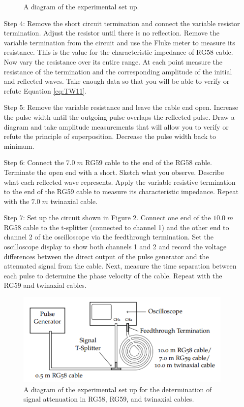 \documentclass[12pt, a4paper, oneside, openright, titlepage]{book}
\begin{document}
\begin{itemize}[leftmargin = 50pt]
\begin{figure}[H]
    \caption{A diagram of the experimental set up.}
    \label{fig:TW2}
\end{figure}
    \item[Step 4:] Remove the short circuit termination and connect the variable resistor termination. Adjust the resistor until there is no reflection. Remove the variable termination from the circuit and use the Fluke meter to measure its resistance. This is the value for the characteristic impedance of RG58 cable. Now vary the resistance over its entire range. At each point measure the resistance of the termination and the corresponding amplitude of the initial and reflected waves. Take enough data so that you will be able to verify or refute Equation \ref{eq:TW11}.
    \item[Step 5:] Remove the variable resistance and leave the cable end open. Increase the pulse width until the outgoing pulse overlaps the reflected pulse. Draw a diagram and take amplitude measurements that will allow you to verify or refute the principle of superposition. Decrease the pulse width back to minimum.
    \item[Step 6:] Connect the $7.0\; m$ RG59 cable to the end of the RG58 cable. Terminate the open end with a short. Sketch what you observe. Describe what each reflected wave represents. Apply the variable resistive termination to the end of the RG59 cable to measure its characteristic impedance. Repeat with the $7.0 \;m$ twinaxial cable.
    \item[Step 7:] Set up the circuit shown in Figure \ref{fig:TW3}. Connect one end of the $10.0 \;m$ RG58 cable to the t-splitter (connected to channel 1) and the other end to channel 2 of the oscilloscope via the feedthrough termination. Set the oscilloscope display to show both channels 1 and 2 and record the voltage differences between the direct output of the pulse generator and the attenuated signal from the cable. Next, measure the time separation between each pulse to determine the phase velocity of the cable. Repeat with the RG59 and twinaxial cables.
        \begin{figure}[H]
    \centering
    \includegraphics[scale = 0.8]{Images/TW3.PNG}
    \caption{A diagram of the experimental set up for the determination of signal attenuation in RG58, RG59, and twinaxial cables.}
    \label{fig:TW3}
\end{figure}
\end{itemize}
\end{document}
